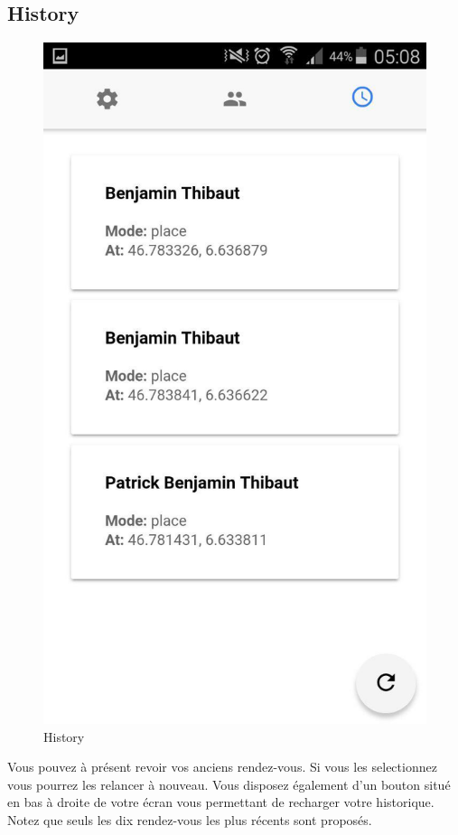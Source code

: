 \documentclass[french]{article}
\begin{document}
	\subsection{History}
	\begin{figure}[H]
		\centering
		\includegraphics[scale=0.4]{../screenshot/screenshot-history}
		\caption{History}
		\label{History}
	\end{figure} 
	Vous pouvez à présent revoir vos anciens rendez-vous. Si vous les selectionnez vous pourrez les relancer à nouveau.
	Vous disposez également d'un bouton situé en bas à droite de votre écran vous permettant de recharger votre historique. Notez que seuls les dix rendez-vous les plus récents sont proposés.
	
\end{document}
